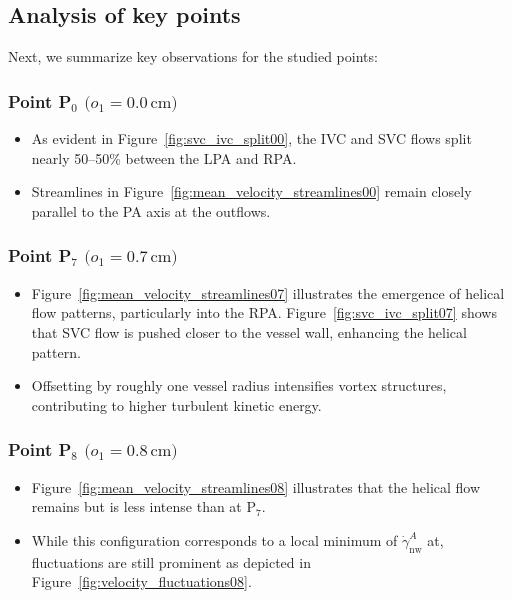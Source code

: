 \subsection*{Analysis of key points}
\noindent
Next, we summarize key observations for the studied points:
\subsubsection*{Point P\(_0\) \(\bigl(o_1 = 0.0\,\mathrm{cm}\bigr)\)}
\begin{itemize}
	\item As evident in Figure~\ref{fig:svc_ivc_split00}, the IVC and SVC flows split nearly 50--50\% between the LPA and RPA. 
	\item Streamlines in Figure~\ref{fig:mean_velocity_streamlines00} remain closely parallel to the PA axis at the outflows.
\end{itemize}
\subsubsection*{Point P\(_7\) \(\bigl(o_1 = 0.7\,\mathrm{cm}\bigr)\)}
\begin{itemize}
	\item Figure~\ref{fig:mean_velocity_streamlines07} illustrates the emergence of helical flow patterns, particularly into the RPA. Figure~\ref{fig:svc_ivc_split07} shows that SVC flow is pushed closer to the vessel wall, enhancing the helical pattern.
	\item Offsetting by roughly one vessel radius intensifies vortex structures, contributing to higher turbulent kinetic energy.
\end{itemize}

\subsubsection*{Point P\(_8\) \(\bigl(o_1 = 0.8\,\mathrm{cm}\bigr)\)}
\begin{itemize}
	\item Figure~\ref{fig:mean_velocity_streamlines08} illustrates that the helical flow remains but is less intense than at P\(_7\).
	\item While this configuration corresponds to a local minimum of $\dot{\gamma}^{A}_{\text{nw}}$ at, fluctuations are still prominent as depicted in Figure~\ref{fig:velocity_fluctuations08}. 
\end{itemize}

